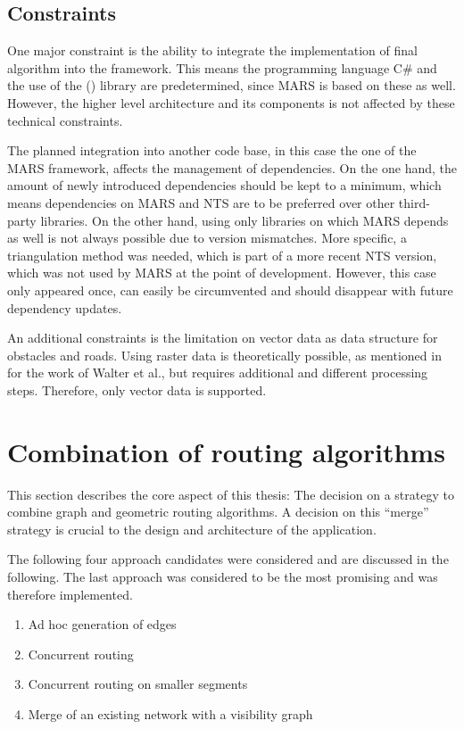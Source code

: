 	\subsection{Constraints}
	\label{subsec:constraints}
		
		One major constraint is the ability to integrate the implementation of final algorithm into the  framework.
		This means the programming language C\# and the use of the  () library are predetermined, since MARS is based on these as well.
		However, the higher level architecture and its components is not affected by these technical constraints.
		
		The planned integration into another code base, in this case the one of the MARS framework, affects the management of dependencies.
		On the one hand, the amount of newly introduced dependencies should be kept to a minimum, which means dependencies on MARS and NTS are to be preferred over other third-party libraries.
		On the other hand, using only libraries on which MARS depends as well is not always possible due to version mismatches.
		More specific, a triangulation method was needed, which is part of a more recent NTS version, which was not used by MARS at the point of development.
		However, this case only appeared once, can easily be circumvented and should disappear with future dependency updates.
		
		An additional constraints is the limitation on vector data as data structure for obstacles and roads.
		Using raster data is theoretically possible, as mentioned in  for the work of Walter et al., but requires additional and different processing steps.
		Therefore, only vector data is supported.
	
\section{Combination of routing algorithms}
\label{sec:combining-routing-algorithms}

	This section describes the core aspect of this thesis:
	The decision on a strategy to combine graph and geometric routing algorithms.
	A decision on this \enquote{merge} strategy is crucial to the design and architecture of the application.
	
	The following four approach candidates were considered and are discussed in the following.
	The last approach was considered to be the most promising and was therefore implemented.
	\begin{enumerate}
		\item Ad hoc generation of edges
		\item Concurrent routing
		\item Concurrent routing on smaller segments
		\item Merge of an existing network with a visibility graph
	\end{enumerate}
	

